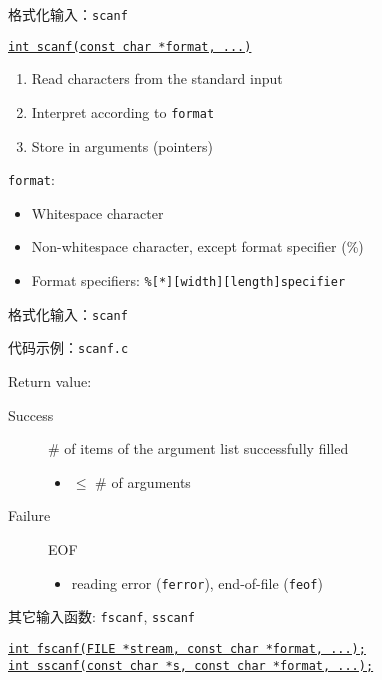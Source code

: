 \begin{frame}{格式化输入：\texttt{scanf}}
  \centerline{\href{http://www.cplusplus.com/reference/cstdio/scanf/}
  {\texttt{int scanf(const char *format, ...)}}}

  \vspace{0.30cm}
  \begin{enumerate}
    \item Read characters from the standard input
    \item Interpret according to \texttt{format}
    \item Store in arguments (pointers)
  \end{enumerate}

  \vspace{0.30cm}
  \pause
  \texttt{format}:
  \begin{itemize}
    \item Whitespace character
    \item Non-whitespace character, except format specifier (\%)
    \item Format specifiers: \texttt{\%[*][width][length]specifier}
  \end{itemize}
\end{frame}

\begin{frame}{格式化输入：\texttt{scanf}}
  \centerline{代码示例：\texttt{scanf.c}}

  \vspace{0.60cm}
  Return value:
  \begin{description}
    \item[Success] \# of items of the argument list successfully filled
      \begin{itemize}
	\item $\le$ \# of arguments
      \end{itemize}
    \item[Failure] EOF
      \begin{itemize}
	\item reading error (\texttt{ferror}), end-of-file (\texttt{feof})
      \end{itemize}
  \end{description}
\end{frame}

\begin{frame}{其它输入函数: \texttt{fscanf}, \texttt{sscanf}}
  \begin{center}
    \href{http://www.cplusplus.com/reference/cstdio/fscanf/}
    {\texttt{int fscanf(FILE *stream, const char *format, ...);}} \\[0.50cm]

    \href{http://www.cplusplus.com/reference/cstdio/sscanf/}
    {\texttt{int sscanf(const char *s, const char *format, ...);}}
  \end{center}
\end{frame}

